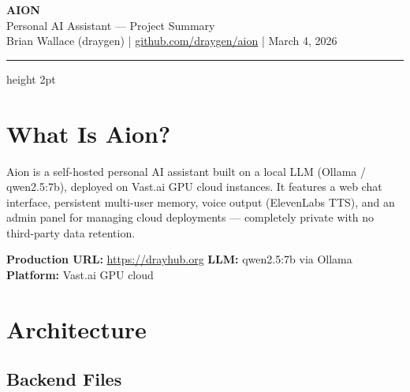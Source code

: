\documentclass[11pt,a4paper]{article}
\begin{document}
\begin{center}
  {\fontsize{28}{34}\selectfont\bfseries\color{navy} AION}\\[4pt]
  {\large\color{muted} Personal AI Assistant — Project Summary}\\[6pt]
  {\small\color{muted} Brian Wallace (draygen) \quad|\quad
   \href{https://github.com/draygen/aion}{github.com/draygen/aion} \quad|\quad
   March 4, 2026}
\end{center}

\vspace{4pt}
\noindent\color{accent}\hrule height 2pt
\vspace{16pt}

\section{What Is Aion?}

Aion is a self-hosted personal AI assistant built on a local LLM (Ollama / qwen2.5:7b),
deployed on Vast.ai GPU cloud instances. It features a web chat interface,
persistent multi-user memory, voice output (ElevenLabs TTS), and an admin panel
for managing cloud deployments — completely private with no third-party data retention.

\begin{callout}
  \textbf{Production URL:} \href{https://drayhub.org}{https://drayhub.org} \quad
  \textbf{LLM:} qwen2.5:7b via Ollama \quad
  \textbf{Platform:} Vast.ai GPU cloud
\end{callout}

\section{Architecture}

\subsection{Backend Files}
\end{document}
